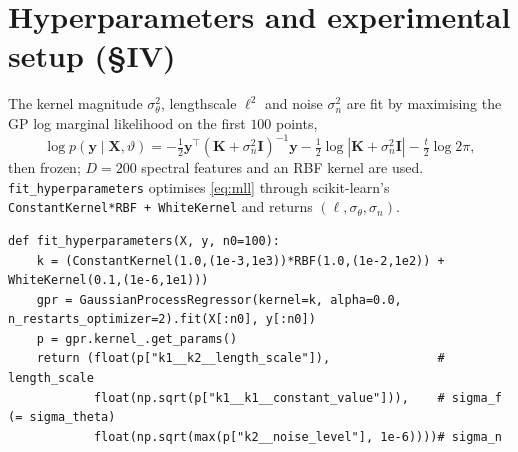 \documentclass[11pt]{article}
\theoremstyle{plain}
\theoremstyle{definition}
\newcommand{\K}{\mathbf{K}}
\newcommand{\I}{\mathbf{I}}
\newcommand{\y}{\mathbf{y}}
\newcommand{\sn}{\sigma_n}
\newcommand{\code}[1]{\texttt{#1}}
\begin{document}
\section{Hyperparameters and experimental setup (\S IV)}\label{sec:hyper}
The kernel magnitude $\sigma_\theta^2$, lengthscale $\ell^2$ and noise $\sn^2$ are fit by maximising the GP log marginal likelihood on the first $100$ points,
\begin{equation}
\log p(\y\mid\mathbf X,\vartheta)=-\tfrac12\y^\top(\K+\sn^2\I)^{-1}\y-\tfrac12\log|\K+\sn^2\I|-\tfrac{t}{2}\log2\pi,
\label{eq:mll}
\end{equation}
then frozen; $D=200$ spectral features and an RBF kernel are used. \code{fit\_hyperparameters} optimises \eqref{eq:mll} through scikit-learn's \code{ConstantKernel*RBF + WhiteKernel} and returns $(\ell,\sigma_\theta,\sn)$.
\begin{lstlisting}
def fit_hyperparameters(X, y, n0=100):
    k = (ConstantKernel(1.0,(1e-3,1e3))*RBF(1.0,(1e-2,1e2)) + WhiteKernel(0.1,(1e-6,1e1)))
    gpr = GaussianProcessRegressor(kernel=k, alpha=0.0, n_restarts_optimizer=2).fit(X[:n0], y[:n0])
    p = gpr.kernel_.get_params()
    return (float(p["k1__k2__length_scale"]),               # length_scale
            float(np.sqrt(p["k1__k1__constant_value"])),    # sigma_f  (= sigma_theta)
            float(np.sqrt(max(p["k2__noise_level"], 1e-6))))# sigma_n
\end{lstlisting}

\end{document}
